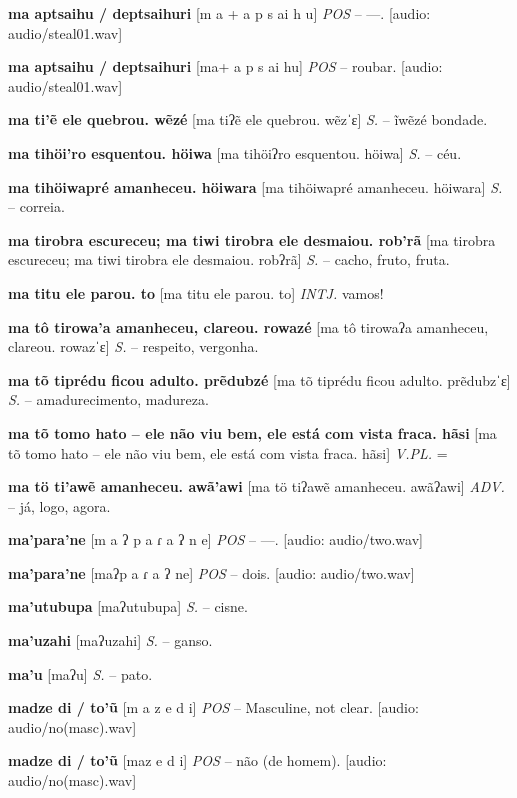 \textbf{ma aptsaihu / deptsaihuri} [m a + a p s ai h u] \textit{POS} -- —. [audio: audio/steal01.wav]{\faHeadphones}

\textbf{ma aptsaihu / deptsaihuri} [ma+ a p s ai hu] \textit{POS} -- roubar. [audio: audio/steal01.wav]{\faHeadphones}

\textbf{ma ti'ẽ ele quebrou. wẽzé} [ma tiʔẽ ele quebrou. wẽzˈɛ] \textit{S.} -- ĩwẽzé bondade.

\textbf{ma tihöi'ro esquentou. höiwa} [ma tihöiʔro esquentou. höiwa] \textit{S.} -- céu.

\textbf{ma tihöiwapré amanheceu. höiwara} [ma tihöiwapré amanheceu. höiwara] \textit{S.} -- correia.

\textbf{ma tirobra escureceu; ma tiwi tirobra ele desmaiou. rob'rã} [ma tirobra escureceu; ma tiwi tirobra ele desmaiou. robʔrã] \textit{S.} -- cacho, fruto, fruta.

\textbf{ma titu ele parou. to} [ma titu ele parou. to] \textit{INTJ.} vamos!

\textbf{ma tô tirowa'a amanheceu, clareou. rowazé} [ma tô tirowaʔa amanheceu, clareou. rowazˈɛ] \textit{S.} -- respeito, vergonha.

\textbf{ma tõ tiprédu ficou adulto. prẽdubzé} [ma tõ tiprédu ficou adulto. prẽdubzˈɛ] \textit{S.} -- amadurecimento, madureza.

\textbf{ma tõ tomo hato -- ele não viu bem, ele está com vista fraca. hãsi} [ma tõ tomo hato -- ele não viu bem, ele está com vista fraca. hãsi] \textit{V.PL.} =

\textbf{ma tö ti'awẽ amanheceu. awã'awi} [ma tö tiʔawẽ amanheceu. awãʔawi] \textit{ADV.} -- já, logo, agora.

\textbf{ma'para'ne} [m a ʔ p a ɾ a ʔ n e] \textit{POS} -- —. [audio: audio/two.wav]{\faHeadphones}

\textbf{ma'para'ne} [maʔp a ɾ a ʔ ne] \textit{POS} -- dois. [audio: audio/two.wav]{\faHeadphones}

\textbf{ma'utubupa} [maʔutubupa] \textit{S.} -- cisne.

\textbf{ma'uzahi} [maʔuzahi] \textit{S.} -- ganso.

\textbf{ma'u} [maʔu] \textit{S.} -- pato.

\textbf{madze di / to'ũ} [m a z e d i] \textit{POS} -- Masculine, not clear. [audio: audio/no(masc).wav]{\faHeadphones}

\textbf{madze di / to'ũ} [maz e d i] \textit{POS} -- não (de homem). [audio: audio/no(masc).wav]{\faHeadphones}

